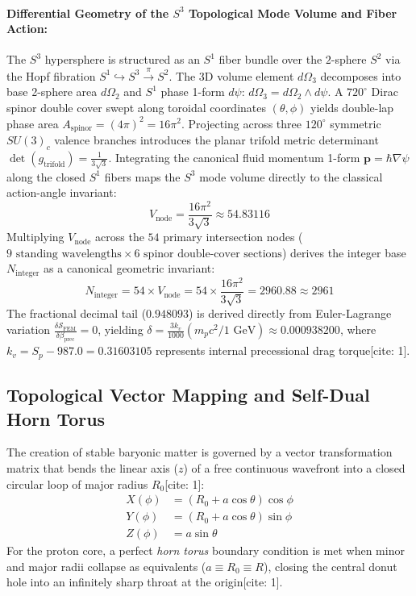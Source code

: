 \documentclass[11pt,a4paper]{article}
\begin{document}
	\paragraph{Differential Geometry of the $S^3$ Topological Mode Volume and Fiber Action:}
	The $S^3$ hypersphere is structured as an $S^1$ fiber bundle over the $2$-sphere $S^2$ via the Hopf fibration $S^1 \hookrightarrow S^3 \xrightarrow{\pi} S^2$. The 3D volume element $d\Omega_3$ decomposes into base 2-sphere area $d\Omega_2$ and $S^1$ phase 1-form $d\psi$: $d\Omega_3 = d\Omega_2 \wedge d\psi$. A $720^\circ$ Dirac spinor double cover swept along toroidal coordinates $(\theta, \phi)$ yields double-lap phase area $A_{\text{spinor}} = (4\pi)^2 = 16\pi^2$. Projecting across three $120^\circ$ symmetric $SU(3)_c$ valence branches introduces the planar trifold metric determinant $\det(g_{\text{trifold}}) = \frac{1}{3\sqrt{3}}$. Integrating the canonical fluid momentum 1-form $\mathbf{p} = \hbar \nabla \psi$ along the closed $S^1$ fibers maps the $S^3$ mode volume directly to the classical action-angle invariant:
	\begin{equation}
		V_{\text{node}} = \frac{16\pi^2}{3\sqrt{3}} \approx 54.83116
	\end{equation}
	Multiplying $V_{\text{node}}$ across the $54$ primary intersection nodes ($9\text{ standing wavelengths} \times 6\text{ spinor double-cover sections}$) derives the integer base $N_{\text{integer}}$ as a canonical geometric invariant:
	\begin{equation}
		N_{\text{integer}} = 54 \times V_{\text{node}} = 54 \times \frac{16\pi^2}{3\sqrt{3}} = 2960.88 \approx 2961
	\end{equation}
	The fractional decimal tail ($0.948093$) is derived directly from Euler-Lagrange variation $\frac{\delta \mathcal{S}_{\text{FEM}}}{\delta \beta_{\text{prec}}} = 0$, yielding $\delta = \frac{3 k_v}{1000} (m_p c^2 / 1\text{ GeV}) \approx 0.000938200$, where $k_v = S_p - 987.0 = 0.31603105$ represents internal precessional drag torque[cite: 1].
	
	\subsection{Topological Vector Mapping and Self-Dual Horn Torus}
	The creation of stable baryonic matter is governed by a vector transformation matrix that bends the linear axis ($z$) of a free continuous wavefront into a closed circular loop of major radius $R_0$[cite: 1]:
	\begin{align}
		X(\phi) &= (R_0 + a \cos\theta) \cos\phi \\
		Y(\phi) &= (R_0 + a \cos\theta) \sin\phi \\
		Z(\phi) &= a \sin\theta
	\end{align}
	For the proton core, a perfect \textit{horn torus} boundary condition is met when minor and major radii collapse as equivalents ($a \equiv R_0 \equiv R$), closing the central donut hole into an infinitely sharp throat at the origin[cite: 1].
	
\end{document}
